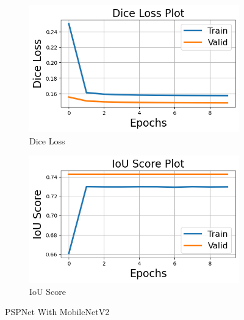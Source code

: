 \documentclass[12pt]{article}
\begin{document}
\begin{figure}[H]
  \begin{subfigure}[b]{0.5\textwidth}
    \includegraphics[width=\textwidth]{Figs/pspnetwithmbnetdice.png}
    \caption{Dice Loss}
    \label{fig:f1}
  \end{subfigure}
  \hfill
  \begin{subfigure}[b]{0.5\textwidth}
    \includegraphics[width=\textwidth]{Figs/pspnetwithmbnetiou.png}
    \caption{IoU Score}
    \label{fig:f2}
  \end{subfigure}
  \caption{PSPNet With MobileNetV2}
\end{figure}
\end{document}
